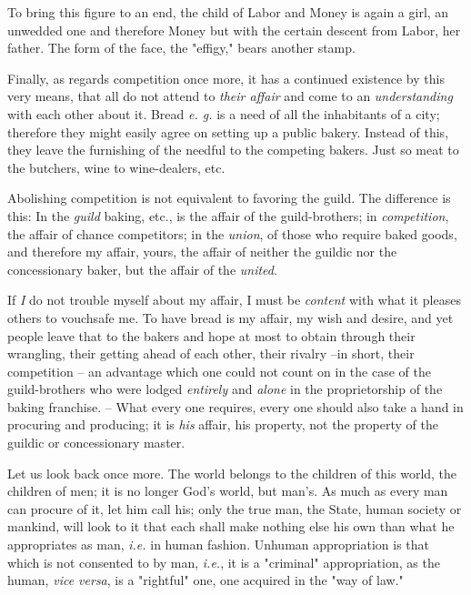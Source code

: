 To bring this figure to an end, the child of Labor and Money is again a girl, 
an unwedded one and therefore Money but with the certain descent from Labor, 
her father. The form of the face, the "{}effigy,"{} bears another stamp.

Finally, as regards competition once more, it has a continued existence by 
this very means, that all do not attend to \textit{their affair} and come to 
an \textit{understanding} with each other about it. Bread \textit{e. g.} is a 
need of all the inhabitants of a city; therefore they might easily agree on 
setting up a public bakery. Instead of this, they leave the furnishing of the 
needful to the competing bakers. Just so meat to the butchers, wine to 
wine-dealers, etc.

Abolishing competition is not equivalent to favoring the guild. The difference 
is this: In the \textit{guild} baking, etc., is the affair of the 
guild-brothers; in \textit{competition}, the affair of chance competitors; in 
the \textit{union}, of those who require baked goods, and therefore my affair, 
yours, the affair of neither the guildic nor the concessionary baker, but the 
affair of the \textit{united}.

If \textit{I} do not trouble myself about my affair, I must be 
\textit{content} with what it pleases others to vouchsafe me. To have bread is 
my affair, my wish and desire, and yet people leave that to the bakers and 
hope at most to obtain through their wrangling, their getting ahead of each 
other, their rivalry --in short, their competition -- an advantage which one 
could not count on in the case of the guild-brothers who were lodged 
\textit{entirely} and \textit{alone} in the proprietorship of the baking 
franchise. -- What every one requires, every one should also take a hand in 
procuring and producing; it is \textit{his} affair, his property, not the 
property of the guildic or concessionary master.

Let us look back once more. The world belongs to the children of this world, 
the children of men; it is no longer God's world, but man's. As much as every 
man can procure of it, let him call his; only the true man, the State, human 
society or mankind, will look to it that each shall make nothing else his own 
than what he appropriates as man, \textit{i.e.} in human fashion. Unhuman 
appropriation is that which is not consented to by man, \textit{i.e.}, it is a 
"{}criminal"{} appropriation, as the human, \textit{vice versa}, is a 
"{}rightful"{} one, one acquired in the "{}way of law."{}

